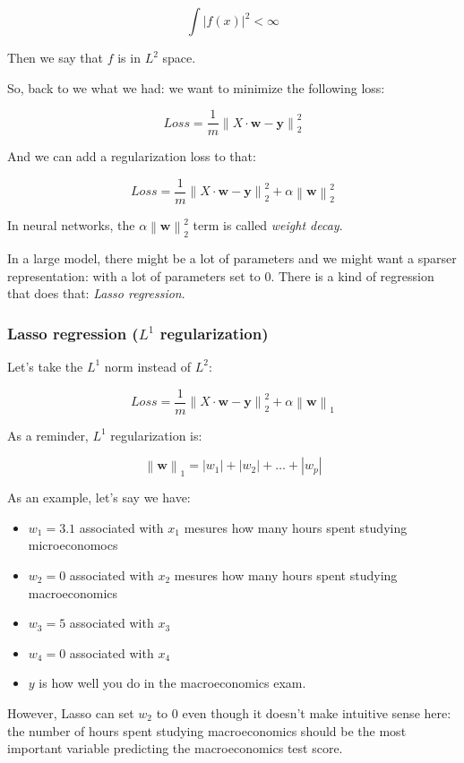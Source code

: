 \documentclass{article}
\theoremstyle{problemstyle}
\begin{document}
\[
  \int \left\lvert f(x) \right\rvert ^{2} < \infty
\]

Then we say that $f$ is in $L^2$ space.

So, back to we what we had: we want to minimize the following loss:

\[
  Loss = \frac{1}{m} \left\lVert X \cdot \textbf{w} - \textbf{y} \right\rVert_2 ^{2}
\]

And we can add a regularization loss to that:

\[
  Loss = \frac{1}{m} \left\lVert X \cdot \textbf{w} - \textbf{y} \right\rVert_2 ^{2} + \alpha \left\lVert \textbf{w} \right\rVert_2 ^{2}
\]

In neural networks, the $\alpha \left\lVert \textbf{w} \right\rVert_2 ^{2}$ term is called \emph{weight decay}.

In a large model, there might be a lot of parameters and we might want a sparser representation: with a lot of parameters set to $0$. There is a kind of regression that does that: \emph{Lasso regression}.

\subsubsection{Lasso regression ($L^1$ regularization)}

Let's take the $L^1$ norm instead of $L^2$:

\[
  Loss = \frac{1}{m} \left\lVert X \cdot \textbf{w} - \textbf{y} \right\rVert_2 ^{2} + \alpha \left\lVert \textbf{w} \right\rVert_1
\]

As a reminder, $L^1$ regularization is:

\[
  \left\lVert \textbf{w} \right\rVert_1 = \left\lvert w_1 \right\rvert + \left\lvert w_2 \right\rvert + \dots + \left\lvert w_p \right\rvert 
\]

As an example, let's say we have:
\begin{itemize}
  \item $w_1 = 3.1$ associated with $x_1$ mesures how many hours spent studying microeconomocs
  \item $w_2 = 0$ associated with $x_2$ mesures how many hours spent studying macroeconomics
  \item $w_3 = 5$ associated with $x_3$
  \item $w_4 = 0$ associated with $x_4$
  \item $y$ is how well you do in the macroeconomics exam.
\end{itemize}

However, Lasso can set $w_2$ to $0$ even though it doesn't make intuitive sense here: the number of hours spent studying macroeconomics should be the most important variable predicting the macroeconomics test score. 
\end{document}
